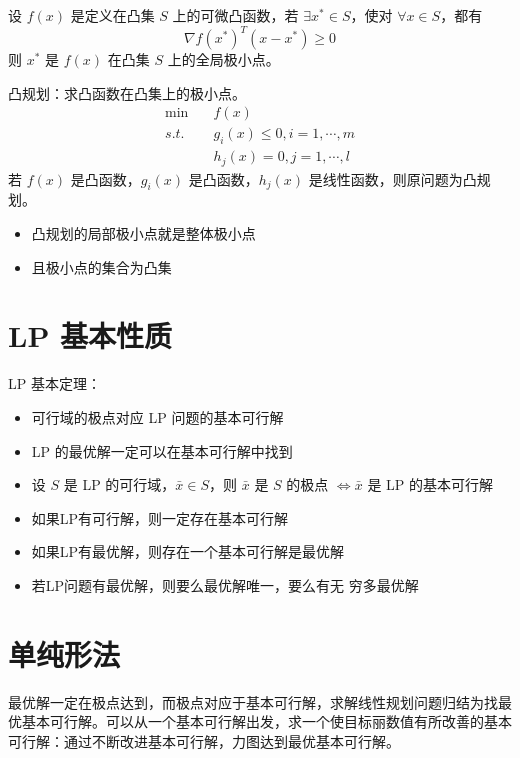 \begin{remark}
    设 $f(x)$ 是定义在凸集 $S$ 上的可微凸函数，若 $\exists x^* \in S$，使对 $\forall x \in S$，都有 \[\nabla f(x^*)^T(x - x^*) \ge 0\]
    则 $x^*$ 是 $f(x)$ 在凸集 $S$ 上的全局极小点。
\end{remark}

\begin{remark}
    凸规划：求凸函数在凸集上的极小点。
    \begin{align*}
        \min \quad &f(x)\\ 
        s.t. \quad &g_{i}(x) \le 0, i=1, \cdots, m \\  
        &h_{j}(x)=0, j=1, \cdots, l 
    \end{align*}
    若 $f(x)$ 是凸函数，$g_i(x)$ 是凸函数，$h_j(x)$ 是线性函数，则原问题为凸规划。
    \begin{itemize} 
        \item 凸规划的局部极小点就是整体极小点
        \item 且极小点的集合为凸集
    \end{itemize}
\end{remark}

\section{LP 基本性质}
\begin{remark}
    LP 基本定理：
    \begin{itemize}
        \item 可行域的极点对应 LP 问题的基本可行解
        \item LP 的最优解一定可以在基本可行解中找到
        \item 设 $S$ 是 LP 的可行域，$\bar{x} \in S$，则 $\bar{x}$ 是 $S$ 的极点 $\Longleftrightarrow \bar{x}$ 是 LP 的基本可行解
        \item 如果LP有可行解，则一定存在基本可行解
        \item 如果LP有最优解，则存在一个基本可行解是最优解
        \item 若LP问题有最优解，则要么最优解唯一，要么有无
        穷多最优解
    \end{itemize}
\end{remark}

\section{单纯形法}
\begin{remark}
    最优解一定在极点达到，而极点对应于基本可行解，求解线性规划问题归结为找最优基本可行解。可以从一个基本可行解出发，求一个使目标丽数值有所改善的基本可行解：通过不断改进基本可行解，力图达到最优基本可行解。
\end{remark}

